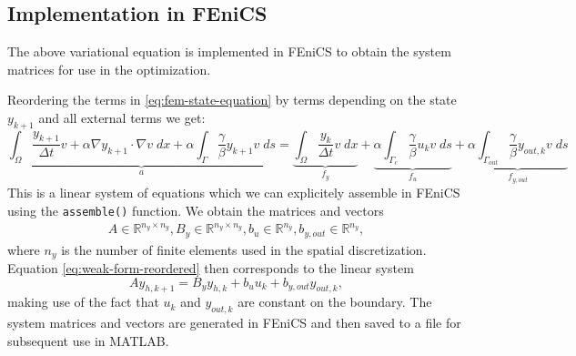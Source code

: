 \documentclass[
12pt, %
a4paper, %
onecolumn, %
portrait %
]{article}
\begin{document}
\subsection{Implementation in FEniCS}
The above variational equation is implemented in FEniCS to obtain the system matrices for use in the optimization.

Reordering the terms in \eqref{eq:fem-state-equation} by terms depending on the state $y_{k+1}$ and all external terms we get:
\begin{equation}
\underbrace{\int_{\Omega} \frac{y_{k+1}}{\Delta t} v + \alpha \nabla y_{k+1} \cdot \nabla v \; dx + \alpha \int_{\Gamma} \frac{\gamma}{\beta}  y_{k+1} v \; ds}_{a} = \underbrace{\int_{\Omega} \frac{y_k}{\Delta t} v \; dx}_{f_y} + \underbrace{\alpha \int_{\Gamma_c} \frac{\gamma}{\beta}  u_k v \; ds}_{f_u}  +  \underbrace{\alpha\int_{\Gamma_{out}} \frac{ \gamma}{\beta}  y_{out,k} v \; ds}_{f_{y,out}}
\label{eq:weak-form-reordered}
\end{equation}
This is a linear system of equations which we can explicitely assemble in FEniCS using the \texttt{assemble()} function. We obtain the matrices and vectors
\begin{align*}
A \in \mathbb{R}^{n_y \times n_y}, B_y \in \mathbb{R}^{n_y \times n_y}, b_u \in \mathbb{R}^{n_y}, b_{y,out} \in \mathbb{R}^{n_y},
\end{align*}
where $n_y$ is the number of finite elements used in the spatial discretization.
Equation \eqref{eq:weak-form-reordered} then corresponds to the linear system
\begin{equation}
A y_{h,k+1} = B_y y_{h,k} + b_u u_k + b_{y,out} y_{out,k},
\end{equation}
making use of the fact that $u_k$ and $y_{out,k}$ are constant on the boundary. The system matrices and vectors are generated in FEniCS and then saved to a file for subsequent use in MATLAB.
\end{document}

